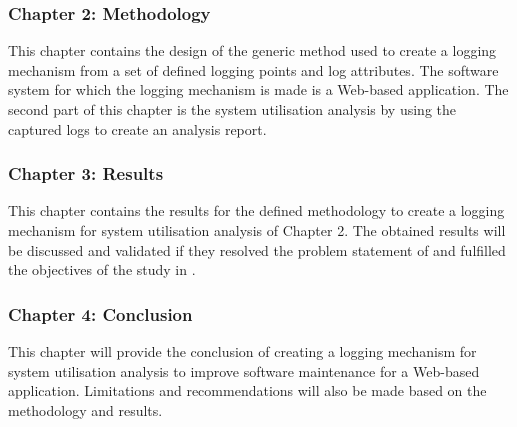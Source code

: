 \subsubsection{Chapter 2: Methodology}
This chapter contains the design of the generic method used to create a logging mechanism from a set of defined logging points and log attributes. The software system for which the logging mechanism is made is a Web-based application. The second part of this chapter is the system utilisation analysis by using the captured logs to create an analysis report.

\subsubsection{Chapter 3: Results}
This chapter contains the results for the defined methodology to create a logging mechanism for system utilisation analysis of Chapter 2. The obtained results will be discussed and validated if they resolved the problem statement of  and fulfilled the objectives of the study in .

\subsubsection{Chapter 4: Conclusion}
This chapter will provide the conclusion of creating a logging mechanism for system utilisation analysis to improve software maintenance for a Web-based application. Limitations and recommendations will also be made based on the methodology and results.
